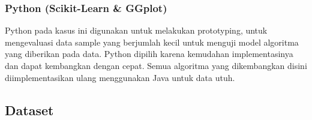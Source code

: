 \documentclass{article}
\begin{document}
\subsubsection{Python (Scikit-Learn \& GGplot)}
\begin{adjustwidth}{4em}{0pt}
		
\hspace{\parindent}Python pada kasus ini digunakan untuk melakukan prototyping, untuk mengevaluasi data sample yang berjumlah kecil untuk menguji model algoritma yang diberikan pada data. Python dipilih karena kemudahan implementasinya dan dapat kembangkan dengan cepat. Semua algoritma yang dikembangkan disini diimplementasikan ulang menggunakan Java untuk data utuh.

\end{adjustwidth}

\subsection{Dataset}
\end{document}
